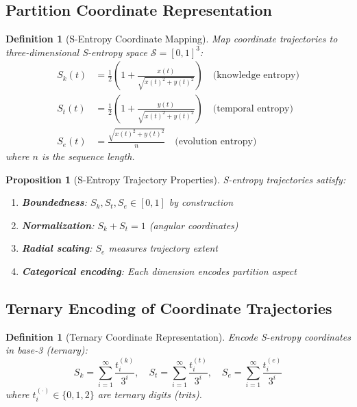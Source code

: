 \documentclass[11pt,a4paper]{article}
\newtheorem{definition}[theorem]{Definition}
\newtheorem{proposition}[theorem]{Proposition}
\theoremstyle{remark}
\newcommand{\Sk}{S_k}
\newcommand{\St}{S_t}
\newcommand{\Se}{S_e}
\newcommand{\Sspace}{\mathcal{S}}
\begin{document}
\subsection{Partition Coordinate Representation}

\begin{definition}[S-Entropy Coordinate Mapping]
\label{def:s_entropy_mapping}
Map coordinate trajectories to three-dimensional S-entropy space $\Sspace = [0,1]^3$:
\begin{align}
\Sk(t) &= \frac{1}{2}\left(1 + \frac{x(t)}{\sqrt{x(t)^2 + y(t)^2}}\right) \quad \text{(knowledge entropy)} \\
\St(t) &= \frac{1}{2}\left(1 + \frac{y(t)}{\sqrt{x(t)^2 + y(t)^2}}\right) \quad \text{(temporal entropy)} \\
\Se(t) &= \frac{\sqrt{x(t)^2 + y(t)^2}}{n} \quad \text{(evolution entropy)}
\end{align}
where $n$ is the sequence length.
\end{definition}

\begin{proposition}[S-Entropy Trajectory Properties]
\label{prop:s_entropy_properties}
S-entropy trajectories satisfy:
\begin{enumerate}
\item \textbf{Boundedness}: $\Sk, \St, \Se \in [0,1]$ by construction
\item \textbf{Normalization}: $\Sk + \St = 1$ (angular coordinates)
\item \textbf{Radial scaling}: $\Se$ measures trajectory extent
\item \textbf{Categorical encoding}: Each dimension encodes partition aspect
\end{enumerate}
\end{proposition}

\subsection{Ternary Encoding of Coordinate Trajectories}

\begin{definition}[Ternary Coordinate Representation]
\label{def:ternary_coords}
Encode S-entropy coordinates in base-3 (ternary):
\begin{equation}
\Sk = \sum_{i=1}^\infty \frac{t_i^{(k)}}{3^i}, \quad \St = \sum_{i=1}^\infty \frac{t_i^{(t)}}{3^i}, \quad \Se = \sum_{i=1}^\infty \frac{t_i^{(e)}}{3^i}
\end{equation}
where $t_i^{(\cdot)} \in \{0, 1, 2\}$ are ternary digits (trits).
\end{definition}
\end{document}
